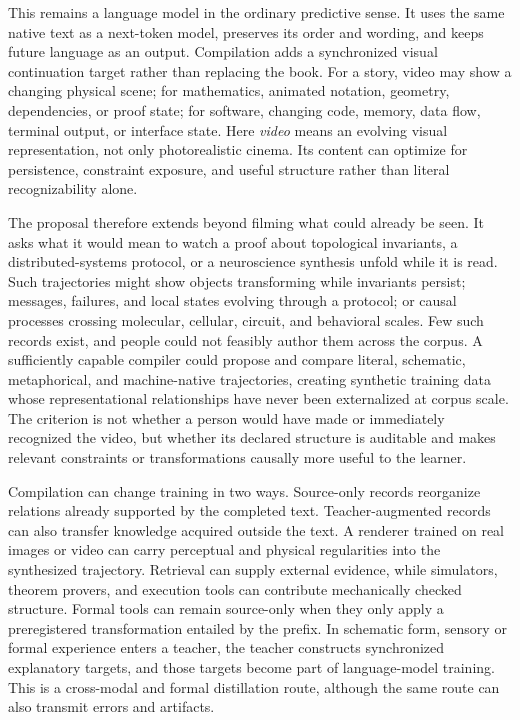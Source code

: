 \documentclass[11pt]{article}
\begin{document}
This remains a language model in the ordinary predictive sense. It uses the same native text as a next-token model, preserves its order and wording, and keeps future language as an output. Compilation adds a synchronized visual continuation target rather than replacing the book. For a story, video may show a changing physical scene; for mathematics, animated notation, geometry, dependencies, or proof state; for software, changing code, memory, data flow, terminal output, or interface state. Here \emph{video} means an evolving visual representation, not only photorealistic cinema. Its content can optimize for persistence, constraint exposure, and useful structure rather than literal recognizability alone.

The proposal therefore extends beyond filming what could already be seen. It asks what it would mean to watch a proof about topological invariants, a distributed-systems protocol, or a neuroscience synthesis unfold while it is read. Such trajectories might show objects transforming while invariants persist; messages, failures, and local states evolving through a protocol; or causal processes crossing molecular, cellular, circuit, and behavioral scales. Few such records exist, and people could not feasibly author them across the corpus. A sufficiently capable compiler could propose and compare literal, schematic, metaphorical, and machine-native trajectories, creating synthetic training data whose representational relationships have never been externalized at corpus scale. The criterion is not whether a person would have made or immediately recognized the video, but whether its declared structure is auditable and makes relevant constraints or transformations causally more useful to the learner.

Compilation can change training in two ways. Source-only records reorganize relations already supported by the completed text. Teacher-augmented records can also transfer knowledge acquired outside the text. A renderer trained on real images or video can carry perceptual and physical regularities into the synthesized trajectory. Retrieval can supply external evidence, while simulators, theorem provers, and execution tools can contribute mechanically checked structure. Formal tools can remain source-only when they only apply a preregistered transformation entailed by the prefix. In schematic form, sensory or formal experience enters a teacher, the teacher constructs synchronized explanatory targets, and those targets become part of language-model training. This is a cross-modal and formal distillation route, although the same route can also transmit errors and artifacts.
\end{document}
